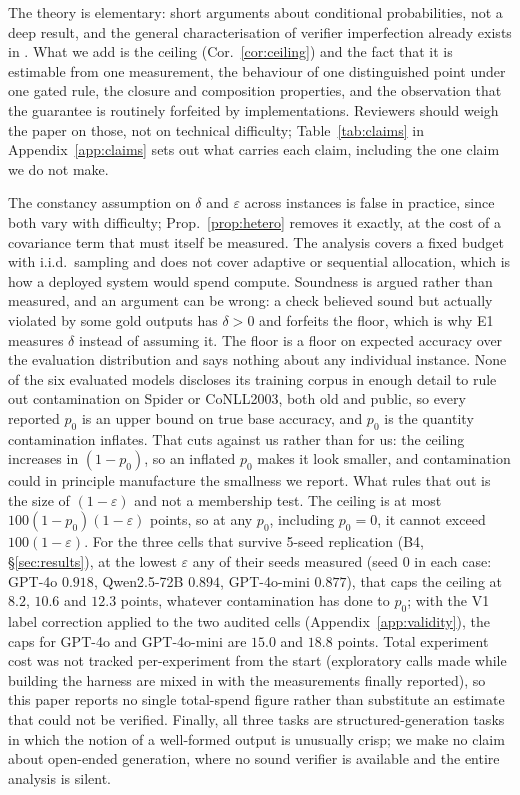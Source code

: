 \documentclass[11pt]{article}
\begin{document}
The theory is elementary: short arguments about conditional probabilities, not a deep result, and the general characterisation of verifier imperfection already exists in \citet{dorner2025rocnreroll}. What we add is the ceiling (Cor.~\ref{cor:ceiling}) and the fact that it is estimable from one measurement, the behaviour of one distinguished point under one gated rule, the closure and composition properties, and the observation that the guarantee is routinely forfeited by implementations. Reviewers should weigh the paper on those, not on technical difficulty;
Table~\ref{tab:claims} in Appendix~\ref{app:claims} sets out what carries each
claim, including the one claim we do not make.

The constancy assumption on $\delta$ and $\varepsilon$ across instances is false in practice, since both vary with difficulty; Prop.~\ref{prop:hetero} removes it exactly, at the cost of a covariance term that must itself be measured. The analysis covers a fixed budget with i.i.d.\ sampling and does not cover adaptive or sequential allocation, which is how a deployed system would spend compute. Soundness is argued rather than measured, and an argument can be wrong: a check believed sound but actually violated by some gold outputs has $\delta>0$ and forfeits the floor, which is why E1 measures $\delta$ instead of assuming it. The floor is a floor on expected accuracy over the evaluation distribution and says nothing about any individual instance. None of the six evaluated models discloses its training corpus in enough detail to rule out contamination on Spider or CoNLL2003, both old and public, so every reported $p_0$ is an upper bound on true base accuracy, and $p_0$ is the quantity contamination inflates. That cuts against us rather than for us: the ceiling increases in $(1-p_0)$, so an inflated $p_0$ makes it look smaller, and contamination could in principle manufacture the smallness we report. What rules that out is the size of $(1-\varepsilon)$ and not a membership test. The ceiling is at most $100(1-p_0)(1-\varepsilon)$ points, so at any $p_0$, including $p_0=0$, it cannot exceed $100(1-\varepsilon)$. For the three cells that survive 5-seed replication (B4, \S\ref{sec:results}), at the lowest $\varepsilon$ any of their seeds measured (seed 0 in each case: GPT-4o $0.918$, Qwen2.5-72B $0.894$, GPT-4o-mini $0.877$), that caps the ceiling at $8.2$, $10.6$ and $12.3$ points, whatever contamination has done to $p_0$; with the V1 label correction applied to the two audited cells (Appendix~\ref{app:validity}), the caps for GPT-4o and GPT-4o-mini are $15.0$ and $18.8$ points. Total experiment cost was not tracked per-experiment from the start (exploratory calls made while building the harness are mixed in with the measurements finally reported), so this paper reports no single total-spend figure rather than substitute an estimate that could not be verified. Finally, all three tasks are structured-generation tasks in which the notion of a well-formed output is unusually crisp; we make no claim about open-ended generation, where no sound verifier is available and the entire analysis is silent.
\end{document}
